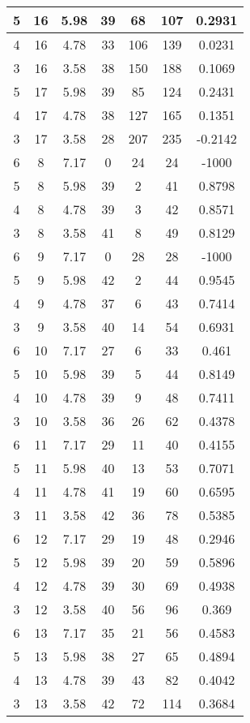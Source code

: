 \documentclass[letterpaper, 12pt]{article}
\begin{document}
\begin{longtable}{|c|c|c|c|c|c|c|}
\hline
5 & 16 & 5.98 & 39 & 68 & 107 & 0.2931 \\
\hline
4 & 16 & 4.78 & 33 & 106 & 139 & 0.0231 \\
\hline
3 & 16 & 3.58 & 38 & 150 & 188 & 0.1069 \\
\hline
5 & 17 & 5.98 & 39 & 85 & 124 & 0.2431 \\
\hline
4 & 17 & 4.78 & 38 & 127 & 165 & 0.1351 \\
\hline
3 & 17 & 3.58 & 28 & 207 & 235 & -0.2142 \\
\hline
6 & 8 & 7.17 & 0 & 24 & 24 & -1000 \\
\hline
5 & 8 & 5.98 & 39 & 2 & 41 & 0.8798 \\
\hline
4 & 8 & 4.78 & 39 & 3 & 42 & 0.8571 \\
\hline
3 & 8 & 3.58 & 41 & 8 & 49 & 0.8129 \\
\hline
6 & 9 & 7.17 & 0 & 28 & 28 & -1000 \\
\hline
5 & 9 & 5.98 & 42 & 2 & 44 & 0.9545 \\
\hline
4 & 9 & 4.78 & 37 & 6 & 43 & 0.7414 \\
\hline
3 & 9 & 3.58 & 40 & 14 & 54 & 0.6931 \\
\hline
6 & 10 & 7.17 & 27 & 6 & 33 & 0.461 \\
\hline
5 & 10 & 5.98 & 39 & 5 & 44 & 0.8149 \\
\hline
4 & 10 & 4.78 & 39 & 9 & 48 & 0.7411 \\
\hline
3 & 10 & 3.58 & 36 & 26 & 62 & 0.4378 \\
\hline
6 & 11 & 7.17 & 29 & 11 & 40 & 0.4155 \\
\hline
5 & 11 & 5.98 & 40 & 13 & 53 & 0.7071 \\
\hline
4 & 11 & 4.78 & 41 & 19 & 60 & 0.6595 \\
\hline
3 & 11 & 3.58 & 42 & 36 & 78 & 0.5385 \\
\hline
6 & 12 & 7.17 & 29 & 19 & 48 & 0.2946 \\
\hline
5 & 12 & 5.98 & 39 & 20 & 59 & 0.5896 \\
\hline
4 & 12 & 4.78 & 39 & 30 & 69 & 0.4938 \\
\hline
3 & 12 & 3.58 & 40 & 56 & 96 & 0.369 \\
\hline
6 & 13 & 7.17 & 35 & 21 & 56 & 0.4583 \\
\hline
5 & 13 & 5.98 & 38 & 27 & 65 & 0.4894 \\
\hline
4 & 13 & 4.78 & 39 & 43 & 82 & 0.4042 \\
\hline
3 & 13 & 3.58 & 42 & 72 & 114 & 0.3684 \\

\end{longtable}
\end{document}

